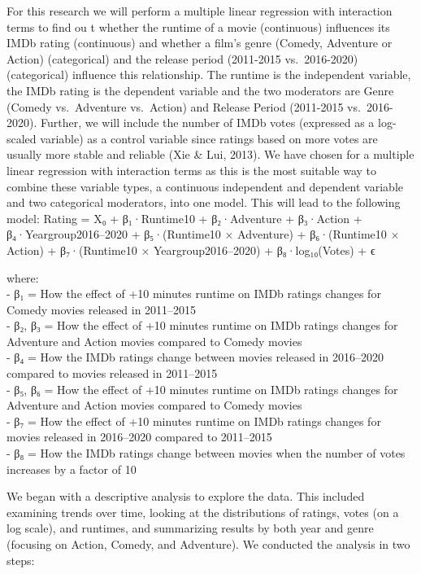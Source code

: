 \documentclass[
]{article}
\begin{document}
For this research we will perform a multiple linear regression with
interaction terms to find ou t whether the runtime of a movie
(continuous) influences its IMDb rating (continuous) and whether a
film's genre (Comedy, Adventure or Action) (categorical) and the release
period (2011-2015 vs.~2016-2020) (categorical) influence this
relationship. The runtime is the independent variable, the IMDb rating
is the dependent variable and the two moderators are Genre (Comedy
vs.~Adventure vs.~Action) and Release Period (2011-2015 vs.~2016-2020).
Further, we will include the number of IMDb votes (expressed as a
log-scaled variable) as a control variable since ratings based on more
votes are usually more stable and reliable (Xie \& Lui, 2013). We have
chosen for a multiple linear regression with interaction terms as this
is the most suitable way to combine these variable types, a continuous
independent and dependent variable and two categorical moderators, into
one model. This will lead to the following model: Rating = X₀ +
β₁·Runtime10 + β₂·Adventure + β₃·Action + β₄·Yeargroup2016--2020 +
β₅·(Runtime10 × Adventure) + β₆·(Runtime10 × Action) + β₇·(Runtime10 ×
Yeargroup2016--2020) + β₈·log₁₀(Votes) + ϵ

where:\\
- β₁ = How the effect of +10 minutes runtime on IMDb ratings changes for
Comedy movies released in 2011--2015\\
- β₂, β₃ = How the effect of +10 minutes runtime on IMDb ratings changes
for Adventure and Action movies compared to Comedy movies\\
- β₄ = How the IMDb ratings change between movies released in 2016--2020
compared to movies released in 2011--2015\\
- β₅, β₆ = How the effect of +10 minutes runtime on IMDb ratings changes
for Adventure and Action movies compared to Comedy movies\\
- β₇ = How the effect of +10 minutes runtime on IMDb ratings changes for
movies released in 2016--2020 compared to 2011--2015\\
- β₈ = How the IMDb ratings change between movies when the number of
votes increases by a factor of 10

We began with a descriptive analysis to explore the data. This included
examining trends over time, looking at the distributions of ratings,
votes (on a log scale), and runtimes, and summarizing results by both
year and genre (focusing on Action, Comedy, and Adventure). We conducted
the analysis in two steps:
\end{document}
